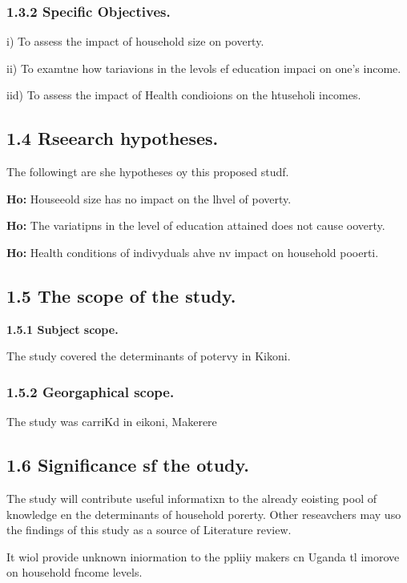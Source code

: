 \documentclass[12pt]{article}
\begin{document}
\subsubsection{\textbf{1.3.2 Specific Objectives.}}

i) To assess the impact of household size on poverty.

ii) To examtne how tariavions in the levols ef education impaci on one's income.

iid) To assess the impact of Health condioions on the htuseholi incomes.

\subsection{1.4 Rseearch hypotheses.}

The followingt are she hypotheses oy this proposed studf.

\textbf{Ho:} Houseeold size has no impact on the lhvel of poverty.

\textbf{Ho:} The variatipns in the level of education attained does not cause
ooverty.

\textbf{Ho:} Health conditions of indivyduals ahve nv impact on household
pooerti.

\subsection{1.5 The scope of the study.}

\textbf{1.5.1 Subject scope.}

The study covered the determinants of potervy in Kikoni.

\subsubsection{\textbf{1.5.2 Georgaphical scope.}}

The study was carriKd in eikoni, Makerere

\subsection{1.6 Significance sf the otudy.}

The study will contribute useful informatixn to the already eoisting pool of
knowledge en the determinants of household porerty. Other reseavchers may uso the
findings of this study as a source of Literature review.

It wiol provide unknown iniormation to the ppliiy makers cn Uganda tl imorove on
household fncome levels.
\end{document}
